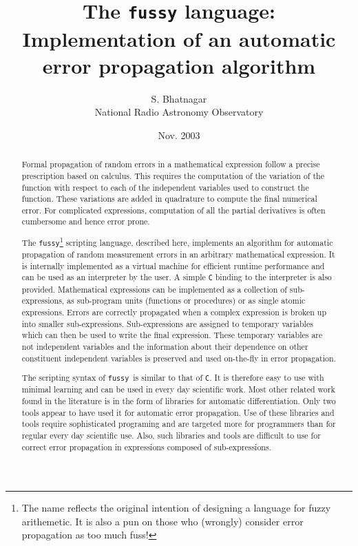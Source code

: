 \documentclass[12pt]{article}
\newcommand{\Fussy}{{\tt fussy}}
\begin{document}
\title{The {\tt fussy} language: Implementation of an automatic
error propagation algorithm}
\author{S. Bhatnagar \\National Radio Astronomy Observatory}
\date{Nov. 2003}
\maketitle
\begin{center}
\end{center}

\begin{abstract} 
Formal propagation of random errors in a mathematical expression
follow a precise prescription based on calculus.  This requires the
computation of the variation of the function with respect to each of
the independent variables used to construct the function.  These
variations are added in quadrature to compute the final numerical
error.  For complicated expressions, computation of all the partial
derivatives is often cumbersome and hence error prone.

The \Fussy\footnote{The name reflects the original intention of
  designing a language for fuzzy arithemetic.  It is also a pun on
  those who (wrongly) consider error propagation as too much fuss!}
scripting language, described here, implements an algorithm for
automatic propagation of random measurement errors in an arbitrary
mathematical expression.  It is internally implemented as a virtual
machine for efficient runtime performance and can be used as an
interpreter by the user.  A simple {\tt C} binding to the interpreter
is also provided.  Mathematical expressions can be implemented as a
collection of sub-expressions, as sub-program units (functions or
procedures) or as single atomic expressions.  Errors are correctly
propagated when a complex expression is broken up into smaller
sub-expressions.  Sub-expressions are assigned to temporary variables
which can then be used to write the final expression.  These temporary
variables are not independent variables and the information about
their dependence on other constituent independent variables is
preserved and used on-the-fly in error propagation.

The scripting syntax of \Fussy\ is similar to that of {\tt C}.  It is
therefore easy to use with minimal learning and can be used in every
day scientific work.  Most other related work found in the literature
is in the form of libraries for automatic differentiation.  Only two
tools appear to have used it for automatic error propagation.  Use of
these libraries and tools require sophisticated programing and are
targeted more for programmers than for regular every day scientific
use.  Also, such libraries and tools are difficult to use for correct
error propagation in expressions composed of sub-expressions.
\end{abstract}
            
\end{document}
